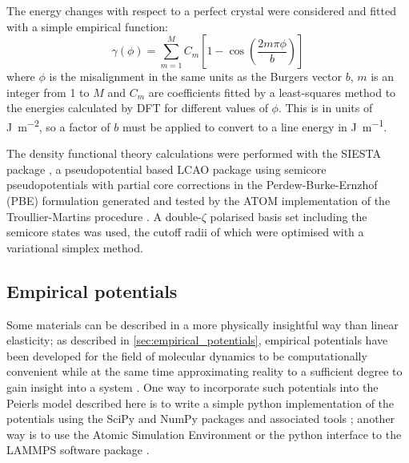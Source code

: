 The energy changes with respect to a perfect crystal were considered and fitted with a simple empirical function:
\begin{equation}
\gamma(\phi) = \sum^{M}_{m=1} C_m \left[ 1 - \cos \left( \frac{2m\pi \phi}{b} \right) \right]
\end{equation}
where $\phi$ is the misalignment in the same units as the Burgers vector $b$, $m$ is an integer from \num{1} to $M$ and $C_m$ are coefficients fitted by a least-squares method to the energies calculated by DFT for different values of $\phi$. This is in units of \si{\joule\per\square\meter}, so a factor of $b$ must be applied to convert to a line energy in \si{\joule\per\meter}.




The density functional theory calculations were performed with the SIESTA package \cite{soler2002}, a pseudopotential based LCAO package using semicore pseudopotentials with partial core corrections in the Perdew-Burke-Ernzhof (PBE) formulation generated and tested by the ATOM implementation of the Troullier-Martins procedure \cite{Troullier1991,Troullier1991a}. A double-$\zeta$ polarised basis set including the semicore states was used, the cutoff radii of which were optimised with a variational simplex method.







\subsection{Empirical potentials}

Some materials can be described in a more physically insightful way than linear elasticity; as described in \autoref{sec:empirical_potentials}, empirical potentials have been developed for the field of molecular dynamics to be computationally convenient while at the same time approximating reality to a sufficient degree to gain insight into a system \cite{martinez2013}. One way to incorporate such potentials into the Peierls model described here is to write a simple python implementation of the potentials using the SciPy and NumPy packages and associated tools \cite{Numpy2011,Ipython2007,Millman2007,SciPy2001}; another way is to use the Atomic Simulation Environment \cite{ASE2017} or the python interface to the LAMMPS software package \cite{Plimpton1995,LAMMPS_web}.



